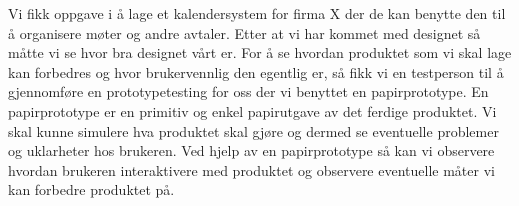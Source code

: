 Vi fikk oppgave i å lage et kalendersystem for firma X der de kan benytte den til å organisere møter og andre avtaler. Etter at vi har kommet med designet så måtte vi se hvor bra designet vårt er. For å se hvordan produktet som vi skal lage kan forbedres og hvor brukervennlig den egentlig er, så fikk vi en testperson til å gjennomføre en prototypetesting for oss der vi benyttet en papirprototype. En papirprototype er en primitiv og enkel papirutgave av det  ferdige produktet. Vi skal kunne simulere hva produktet skal gjøre og dermed se eventuelle problemer og uklarheter hos brukeren. Ved hjelp av en papirprototype så kan vi observere hvordan brukeren interaktivere med produktet og observere eventuelle måter vi kan forbedre produktet på. 